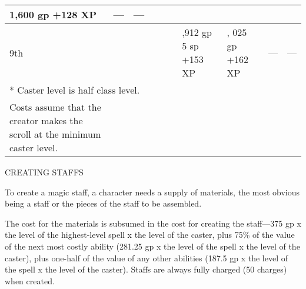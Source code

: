 \begin{longtable}{llllllllll}
{\begin{minipage}[t]{0.913in}
1,600 gp\linebreak
+128 XP\end{minipage}} & \multicolumn{1}{p{0.877in}|}{\begin{minipage}[t]{0.877in}\centering
---\end{minipage}} & \multicolumn{1}{p{0.877in}|}{\begin{minipage}[t]{0.877in}\centering
---\end{minipage}}\\
\hline
\multicolumn{6}{p{1.066in}|}{\begin{minipage}[t]{1.066in}\centering
9th\end{minipage}} & \multicolumn{1}{|p{0.767in}|}{\begin{minipage}[t]{0.767in}\centering
1,912 gp 5 sp\linebreak
+153 XP\end{minipage}} & \multicolumn{1}{p{0.913in}|}{\begin{minipage}[t]{0.913in}\centering
2, 025 gp\linebreak
+162 XP\end{minipage}} & \multicolumn{1}{p{0.877in}|}{\begin{minipage}[t]{0.877in}\centering
---\end{minipage}} & \multicolumn{1}{p{0.877in}|}{\begin{minipage}[t]{0.877in}\centering
---\end{minipage}}\\
\hline
\multicolumn{6}{p{1.066in}|}{\begin{minipage}[t]{1.066in}\centering
* Caster level is half class level.\end{minipage}}\\
\hline
\multicolumn{1}{|p{0.767in}|}{\begin{minipage}[t]{0.767in}\centering
Costs assume that the creator makes the scroll at the minimum caster level.\end{minipage}}\\
\hline
\end{longtable}

\vspace{12pt}
{\large CREATING STAFFS}

To create a magic staff, a character needs a supply of materials, the most obvious 
being a staff or the pieces of the staff to be assembled.

The cost for the materials is subsumed in the cost for creating the staff---375 
gp x the level of the highest-level spell x the level of the caster, plus 75\% 
of the value of the next most costly ability (281.25 gp x the level of the spell 
x the level of the caster), plus one-half of the value of any other abilities (187.5 
gp x the level of the spell x the level of the caster). Staffs are always fully 
charged (50 charges) when created.

